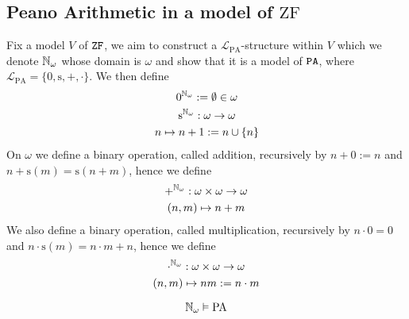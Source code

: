 \subsection{Peano Arithmetic in a model of $\mathrm{ZF}$}
Fix a model $V$ of $\verb|ZF|$, we aim to construct a $\mathcal{L}_{\mathrm{PA}}$-structure within $V$ which we denote $\mathbb{N}_{\omega}$ whose domain is $\omega$ and show that it is a model of $\verb|PA|$, where $\mathcal{L}_{\mathrm{PA}}=\{0,\mathrm{s},+,\cdot\}$. We then define 
\begin{gather*}
    0^{\mathbb{N}_\omega} := \emptyset\in \omega\\
    \mathrm{s}^{\mathbb{N}_\omega} : \omega \rightarrow \omega\\
    n \mapsto n+1:= n\cup\{n\}\\
\end{gather*}
On $\omega$ we define a binary operation, called addition, recursively by $n+0:= n$ and $n+\mathrm{s}(m)=\mathrm{s}(n+m)$, hence we define 
\begin{gather*}
    +^{\mathbb{N}_\omega}: \omega \times \omega \rightarrow \omega\\
    (n,m) \mapsto n+m
\end{gather*}
We also define a binary operation, called multiplication, recursively by $n\cdot 0 = 0$ and $n\cdot \mathrm{s}(m)= n\cdot m+n$, hence we define 
\begin{gather*}
    \cdot^{\mathbb{N}_\omega}: \omega\times \omega \rightarrow \omega\\
    (n,m)\mapsto nm := n\cdot m
\end{gather*}
\begin{theorem}
    $$\mathbb{N}_\omega \vDash \mathrm{PA}$$
\end{theorem}

